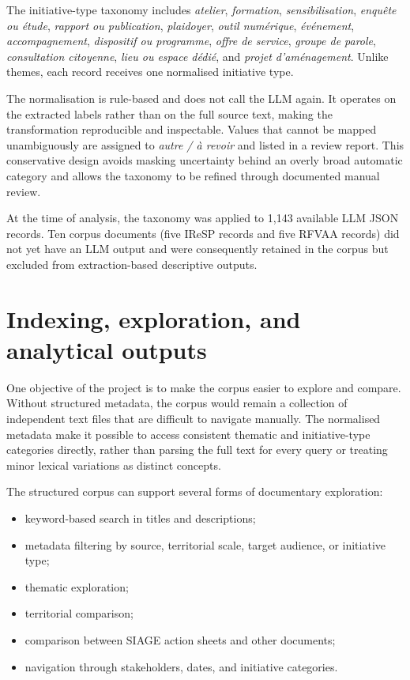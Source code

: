 The initiative-type taxonomy includes \textit{atelier}, \textit{formation},
\textit{sensibilisation}, \textit{enquête ou étude}, \textit{rapport ou
publication}, \textit{plaidoyer}, \textit{outil numérique},
\textit{événement}, \textit{accompagnement}, \textit{dispositif ou
programme}, \textit{offre de service}, \textit{groupe de parole},
\textit{consultation citoyenne}, \textit{lieu ou espace dédié}, and
\textit{projet d'aménagement}. Unlike themes, each record receives one
normalised initiative type.

The normalisation is rule-based and does not call the LLM again. It operates on
the extracted labels rather than on the full source text, making the
transformation reproducible and inspectable. Values that cannot be mapped
unambiguously are assigned to \textit{autre / à revoir} and listed in a review
report. This conservative design avoids masking uncertainty behind an overly
broad automatic category and allows the taxonomy to be refined through
documented manual review.

At the time of analysis, the taxonomy was applied to 1,143 available LLM JSON
records. Ten corpus documents (five IReSP records and five RFVAA records) did
not yet have an LLM output and were consequently retained in the corpus but
excluded from extraction-based descriptive outputs.

\section{Indexing, exploration, and analytical outputs}

One objective of the project is to make the corpus easier to explore and compare.
Without structured metadata, the corpus would remain a collection of independent
text files that are difficult to navigate manually. The normalised metadata make
it possible to access consistent thematic and initiative-type categories
directly, rather than parsing the full text for every query or treating minor
lexical variations as distinct concepts.

The structured corpus can support several forms of documentary exploration:

\begin{itemize}
    \item keyword-based search in titles and descriptions;
    \item metadata filtering by source, territorial scale, target audience, or
    initiative type;
    \item thematic exploration;
    \item territorial comparison;
    \item comparison between SIAGE action sheets and other documents;
    \item navigation through stakeholders, dates, and initiative categories.
\end{itemize}

